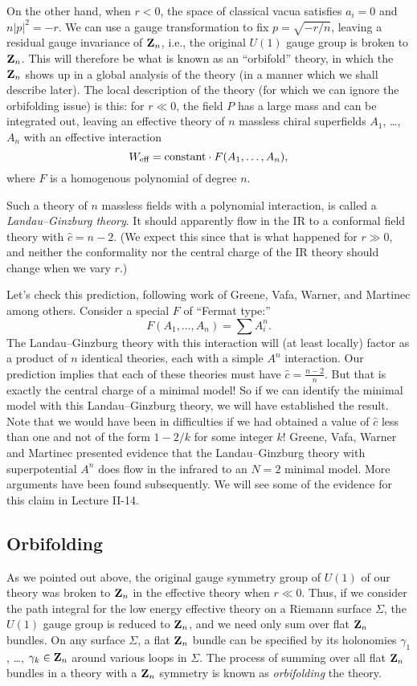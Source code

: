 On the other hand, when $r<0$, the space of classical vacua satisfies
$a_i=0$ and $n|p|^2=-r$.  We can use a gauge transformation to fix
$p=\sqrt{-r/n}$, leaving a residual gauge invariance of ${\bf Z}_n$, i.e.,
the original $U(1)$ gauge group is broken to ${\bf Z}_n$.  This will
therefore be what is known as
an ``orbifold'' theory, in which the ${\bf Z}_n$ shows up in a
global analysis of the theory (in a manner which we shall describe later).
The local description of the theory (for which we can ignore the orbifolding
 issue) is this:
for $r\ll0$, the field $P$ has a large mass and can be integrated out,
leaving an effective
theory of $n$ massless chiral superfields $A_1$, \dots, $A_n$
with an effective interaction
$$W_{\mbox{\scriptsize eff}}=\mbox{constant}\cdot F(A_1,\dots,A_n),$$
where $F$ is a homogenous polynomial of degree $n$.

Such a theory of $n$ massless fields with a polynomial interaction,
 is called a {\it Landau--Ginzburg theory}.  It should apparently
 flow in the IR to a conformal field theory with $\widehat{c}=n-2$.
(We expect this since that is what happened for $r\gg0$, and neither the
conformality nor the central charge of the IR theory should change when we
vary $r$.)

Let's check this prediction, following work of Greene, Vafa, Warner, and
Martinec among others.
Consider a special $F$ of ``Fermat type:''
$$F(A_1,\dots,A_n)=\sum A_i^n.$$
The Landau--Ginzburg theory with this interaction will (at least locally)
factor as a product of $n$ identical theories, each with a simple $A^n$
interaction.  Our prediction implies that each of these theories must have
$\widehat{c}=\frac{n-2}n$.  But that is exactly the central charge of a minimal
model!  So if we can identify the minimal model with this Landau--Ginzburg
theory, we will have established the result.
Note that we would have been in difficulties if we had obtained a
value of $\widehat c$ less than one and not of the form $1-2/k$ for
some integer $k$!
Greene, Vafa, Warner  and
Martinec presented evidence that the Landau--Ginzburg theory with
superpotential $A^n$ does flow in the infrared to an $N=2$ minimal
model.  More arguments have been found subsequently. We will see some of the
evidence for this claim in Lecture II-14.

\subsection{Orbifolding}

As we pointed out above, the original gauge symmetry group of $U(1)$
of our theory was broken
to ${\bf Z}_n$ in the effective theory when $r\ll0$.  Thus,
if we consider the path integral for the low energy effective theory
on a Riemann surface $\Sigma$, the $U(1)$ gauge group is reduced to ${\bf
Z}_n$,
and we need only sum over flat ${\bf Z}_n$ bundles.
  On any surface  $\Sigma$,  a flat ${\bf Z}_n$ bundle
can be specified by its
holonomies $\gamma_1$, \dots, $\gamma_k\in{\bf Z}_n$ around various loops
in $\Sigma$.  The process of summing over all flat ${\bf Z}_n$ bundles in
a theory with a ${\bf Z}_n$ symmetry is known as {\it orbifolding}\/ the
theory.

